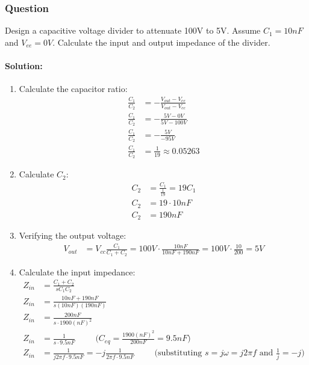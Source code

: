 \subsubsection{Question}
Design a capacitive voltage divider to attenuate 100V to 5V.
Assume \(C_1 = 10nF\) and \(V_{ee} = 0V\). Calculate the input
and output impedance of the divider.
\paragraph{Solution:}
\begin{enumerate}
  \item Calculate the capacitor ratio:
    \begin{align*}
      \frac{C_1}{C_2} &= -\frac{V_{out} - V_{ee}}{V_{out} - V_{cc}} \\
      \frac{C_1}{C_2} &= -\frac{5V - 0V}{5V - 100V} \\
      \frac{C_1}{C_2} &= -\frac{5V}{-95V} \\
      \frac{C_1}{C_2} &= \frac{1}{19} \approx 0.05263
    \end{align*}
  \item Calculate \(C_2\):
    \begin{align*}
      C_2 &= \frac{C_1}{\frac{1}{19}} = 19 C_1 \\
      C_2 &= 19 \cdot 10nF \\
      C_2 &= 190nF
    \end{align*}
  \item Verifying the output voltage:
    \begin{align*}
      V_{out} &= V_{cc} \frac{C_1}{C_1 + C_2} = 100V \cdot \frac{10nF}{10nF + 190nF} = 100V \cdot \frac{10}{200} = 5V
    \end{align*}
  \item Calculate the input impedance:
    \begin{align*}
      Z_{in} &= \frac{C_1 + C_2}{s C_1 C_2} \\
      Z_{in} &= \frac{10nF + 190nF}{s (10nF)(190nF)} \\
      Z_{in} &= \frac{200nF}{s \cdot 1900 (nF)^2} \\
      Z_{in} &= \frac{1}{s \cdot 9.5nF} \hspace{1cm} \text{(\(C_{eq} = \frac{1900 (nF)^2}{200nF} = 9.5nF\))} \\
      Z_{in} &= \frac{1}{j 2 \pi f \cdot 9.5nF} = -j \frac{1}{2 \pi f \cdot 9.5nF} \hspace{1cm} \text{(substituting \(s = j \omega = j 2 \pi f\) and \(\frac{1}{j} = -j\))}

\end{align*}
\end{enumerate}
